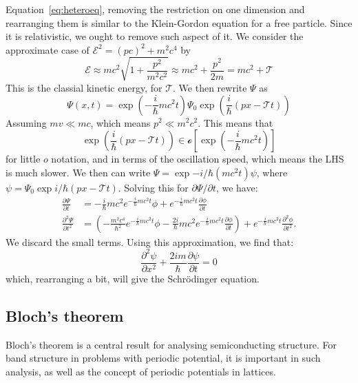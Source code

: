 Equation~\ref{eq:heteroeq}, removing the restriction on one dimension and rearranging them is similar to the Klein-Gordon equation for a free particle. Since it is relativistic, we ought to remove such aspect of it. We consider the approximate case of $\mathcal{E}^{2}= (pc)^2+ m^{2}c^{4}$ by \begin{equation}
    \mathcal{E} \approx mc^{2} \sqrt{1+ \frac{p^{2}}{m^2 c^2}} \approx mc^{2}+ \frac{p^{2}}{2m} = mc^{2} + \mathcal{T}
\end{equation}
This is the classial kinetic energy, for $\mathcal{T}$. We then rewrite $\Psi$ as \begin{equation}
    \Psi(x,t) = \exp{\left(-\frac{i}{\hbar}mc^2 t\right)}\Psi_{0}\exp{\left(\frac{i}{\hbar}(px-\mathcal{T}t)\right)}
\end{equation}
Assuming $mv \ll mc$, which means $p^{2}\ll m^{2}c^{2}$. This means that \begin{equation}
    \exp{\left(\frac{i}{\hbar}(px-\mathcal{T}t)\right)}\in \mathcal{o}\left[\exp{\left(-\frac{i}{\hbar}mc^2 t\right)}\right]
\end{equation}
for little $o$ notation, and in terms of the oscillation speed, which means the LHS is much slower. We then can write $\Psi = \exp{-i/\hbar (mc^2 t)}\psi$, where $\psi = \Psi_{0}\exp{i/\hbar (px-\mathcal{T}t)}$. Solving this for $\partial \Psi/\partial t$, we have: 
\begin{align}
    \frac{\partial \Psi}{\partial t} &= -\frac{i}{\hbar} mc^2 e^{-\frac{i}{\hbar} mc^2 t} \phi + e^{-\frac{i}{\hbar} mc^2 t} \frac{\partial \phi}{\partial t} \\[10pt]
    \frac{\partial^2 \Psi}{\partial t^2} &= \left( -\frac{m^2 c^4}{\hbar^2} e^{-\frac{i}{\hbar} mc^2 t} \phi - \frac{2i}{\hbar} mc^2 e^{-\frac{i}{\hbar} mc^2 t} \frac{\partial \phi}{\partial t} \right) + e^{-\frac{i}{\hbar} mc^2 t} \frac{\partial^2 \phi}{\partial t^2}.
\end{align}
We discard the small terms. Using this approximation, we find that: \begin{equation}
    \frac{\partial^{2}\psi}{\partial x^{2}} + \frac{2im}{\hbar}\frac{\partial \psi}{\partial t} = 0
\end{equation}
which, rearranging a bit, will give the Schrödinger equation. 

\subsection{Bloch's theorem}
Bloch's theorem is a central result for analysing semiconducting structure. For band structure in problems with periodic potential, it is important in such analysis, as well as the concept of periodic potentials in lattices. 


